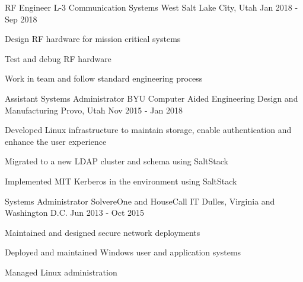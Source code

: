\begin{cventries}
    \cventry
    {RF Engineer} %
    {L-3 Communication Systems West} %
    {Salt Lake City, Utah} %
    {Jan 2018 - Sep 2018} %
    {
        \begin{cvitems} %
        \item {Design RF hardware for mission critical systems}
        \item {Test and debug RF hardware}
        \item {Work in team and follow standard engineering process}
        \end{cvitems}
    }

    \cventry
    {Assistant Systems Administrator} %
    {BYU Computer Aided Engineering Design and Manufacturing} %
    {Provo, Utah} %
    {Nov 2015 - Jan 2018} %
    {
        \begin{cvitems} %
        \item {Developed Linux infrastructure to maintain storage, enable authentication and enhance the user experience}
        \item {Migrated to a new LDAP cluster and schema using SaltStack}
        \item {Implemented MIT Kerberos in the environment using SaltStack}
        \end{cvitems}
    }

    \cventry
    {Systems Administrator} %
    {SolvereOne and HouseCall IT} %
    {Dulles, Virginia and Washington D.C.} %
    {Jun 2013 - Oct 2015} %
    {
        \begin{cvitems} %
        \item {Maintained and designed secure network deployments}
        \item {Deployed and maintained Windows user and application systems}
        \item {Managed Linux administration}
        \end{cvitems}
    }

\end{cventries}
